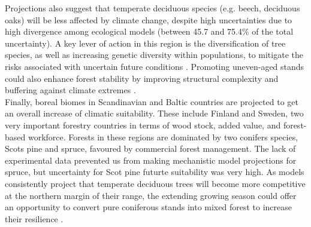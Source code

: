\documentclass[11pt,letter]{article}
\begin{document}
Projections also suggest that temperate deciduous species (e.g. beech, deciduous oaks) will be less affected by climate change, despite high uncertainties due to high divergence among ecological models (between 45.7 and 75.4\% of the total uncertainty).
A key lever of action in this region is the diversification of tree species, as well as increasing genetic diversity within populations, to mitigate the risks associated with uncertain future conditions \citep{Morin2014, Ammer2019, Pretzsch2021, Vospernik2024}. Promoting uneven-aged stands could also enhance forest stability by improving structural complexity and buffering against climate extremes \citep{Vangi2024, Zhang2024a}.\\
Finally, boreal biomes in Scandinavian and Baltic countries are projected to get an overall increase of climatic suitability. These include Finland and Sweden, two very important forestry countries in terms of wood stock, added value, and forest-based workforce.
Forests in these regions are dominated by two conifers species, Scots pine and spruce, favoured by commercial forest management. The lack of experimental data prevented us from making mechanistic model projections for spruce, but uncertainty for Scot pine futurte suitability was very high. As models consistently project that temperate deciduous trees will become more competitive at the northern margin of their range, the extending growing season could offer an opportunity to convert pure coniferous stands into mixed forest to increase their resilience \citep{Schauer2023}.

\end{document}
